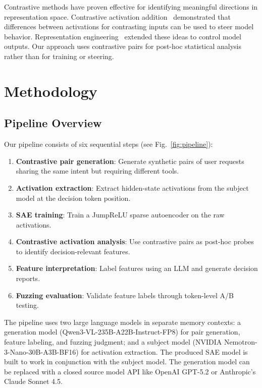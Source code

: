 \documentclass[runningheads]{llncs}
\begin{document}
Contrastive methods have proven effective for identifying meaningful directions in representation space. Contrastive activation addition~\cite{turner2024steeringlanguagemodelsactivation} demonstrated that differences between activations for contrasting inputs can be used to steer model behavior. Representation engineering~\cite{zou2025representationengineeringtopdownapproach} extended these ideas to control model outputs. Our approach uses contrastive pairs for post-hoc statistical analysis rather than for training or steering.


\section{Methodology}
\label{sec:methodology}

\subsection{Pipeline Overview}

Our pipeline consists of six sequential steps (see Fig.~\ref{fig:pipeline}):

\begin{enumerate}
\item \textbf{Contrastive pair generation}: Generate synthetic pairs of user requests sharing the same intent but requiring different tools.
\item \textbf{Activation extraction}: Extract hidden-state activations from the subject model at the decision token position.
\item \textbf{SAE training}: Train a JumpReLU sparse autoencoder on the raw activations.
\item \textbf{Contrastive activation analysis}: Use contrastive pairs as post-hoc probes to identify decision-relevant features.
\item \textbf{Feature interpretation}: Label features using an LLM and generate decision reports.
\item \textbf{Fuzzing evaluation}: Validate feature labels through token-level A/B testing.
\end{enumerate}

The pipeline uses two large language models in separate memory contexts: a generation model (Qwen3-VL-235B-A22B-Instruct-FP8) for pair generation, feature labeling, and fuzzing judgment; and a subject model (NVIDIA Nemotron-3-Nano-30B-A3B-BF16) for activation extraction. The produced SAE model is built to work in conjunction with the subject model. The generation model can be replaced with a closed source model API like OpenAI GPT-5.2 or Anthropic's Claude Sonnet 4.5.
\end{document}
